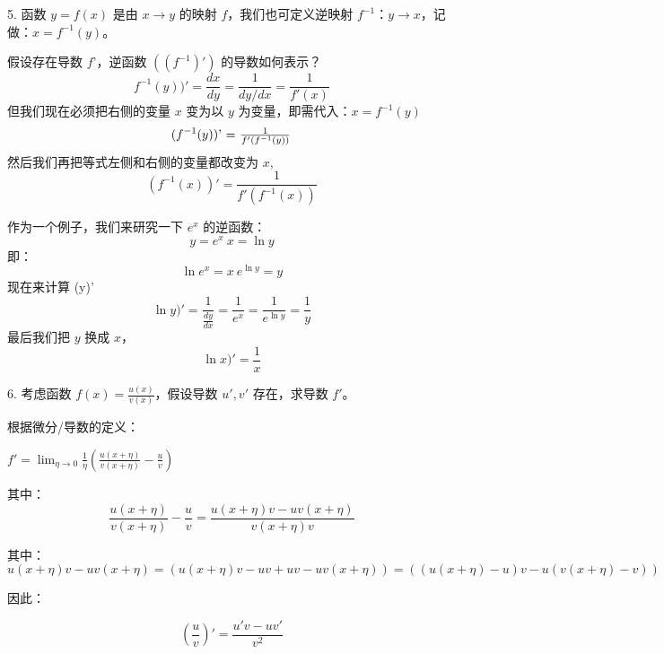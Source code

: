 5. 函数 $y = f(x)$ 是由 $x \to y$ 的映射 $f$，我们也可定义逆映射 $f^{-1}$：$y \to x$，记做：$x = f^{-1}(y)$。

假设存在导数 $f$'，逆函数 $((f^{-1})')$ 的导数如何表示？
\begin{equation}
f^{-1}(y))' = \frac{dx}{dy} = \frac{1}{dy/dx} = \frac{1}{f'(x)}~
\end{equation}
但我们现在必须把右侧的变量 $x$ 变为以 $y$ 为变量，即需代入：$x = f^{-1}(y)$~
\begin{equation}
(f^{-1}(y))$' = $\frac{1}{f'(f^{-1}(y))}~
\end{equation}
然后我们再把等式左侧和右侧的变量都改变为 $x$,
\begin{equation}
(f^{-1}(x))' = \frac{1}{f'(f^{-1}(x))}~
\end{equation}

作为一个例子，我们来研究一下 $e^x$ 的逆函数：
\begin{equation}
y = e^x~
x = \ln y~
\end{equation}
即：
\begin{equation}
\ln e^x = x~
e^{\ln y} = y~
\end{equation}
现在来计算 (\ln y)'~
\begin{equation}
\ln y)' = \frac{1}{\frac{dy}{dx}} = \frac{1}{e^x} = \frac{1}{e^{\ln y}} = \frac{1}{y}~
\end{equation}
最后我们把 $y$ 换成 $x$，
\begin{equation}
\ln x)' = \frac{1}{x}~
\end{equation}

6. 考虑函数 $f(x) = \frac{u(x)}{v(x)}$，假设导数 $u', v'$ 存在，求导数 $f'$。

根据微分/导数的定义：

$f' = \lim_{\eta \to 0} \frac{1}{\eta} \left( \frac{u(x+\eta)}{v(x+\eta)} - \frac{u}{v} \right)$


其中：
\begin{equation}
\frac{u(x+\eta)}{v(x+\eta)} - \frac{u}{v} = \frac{u(x+\eta)v - uv(x+\eta)}{v(x+\eta)v}~
\end{equation}

其中：
\begin{equation}
u(x+\eta)v - uv(x+\eta) = (u(x+\eta)v - uv + uv - uv(x+\eta)) = ((u(x+\eta) - u)v - u(v(x+\eta) - v))~
\end{equation}

因此：

\begin{equation}
\left( \frac{u}{v} \right)' = \frac{u'v - uv'}{v^2} \tag{50}~
\end{equation}

